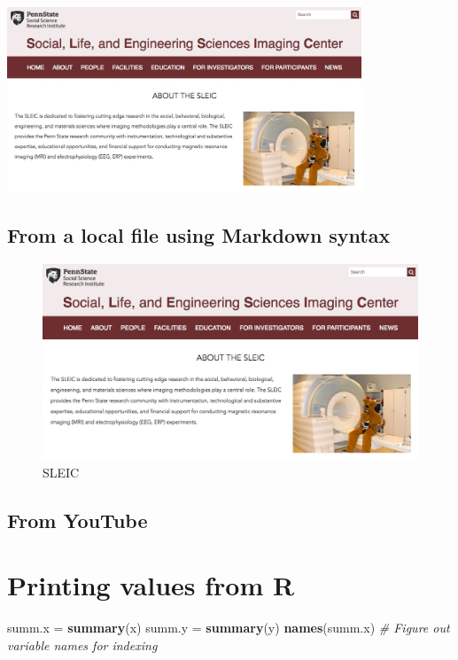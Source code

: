 \documentclass[]{article}
\newenvironment{Shaded}{\begin{snugshade}}{\end{snugshade}}
\newcommand{\CommentTok}[1]{\textcolor[rgb]{0.56,0.35,0.01}{\textit{#1}}}
\newcommand{\KeywordTok}[1]{\textcolor[rgb]{0.13,0.29,0.53}{\textbf{#1}}}
\newcommand{\NormalTok}[1]{#1}
\newcommand{\StringTok}[1]{\textcolor[rgb]{0.31,0.60,0.02}{#1}}
\begin{document}
\begin{center}\includegraphics[width=400px]{img/sleic} \end{center}

\hypertarget{from-a-local-file-using-markdown-syntax}{%
\subsection{From a local file using Markdown
syntax}\label{from-a-local-file-using-markdown-syntax}}

\begin{figure}
\centering
\includegraphics{img/sleic.jpg}
\caption{SLEIC}
\end{figure}

\hypertarget{from-youtube}{%
\subsection{From YouTube}\label{from-youtube}}

\hypertarget{printing-values-from-r}{%
\section{Printing values from R}\label{printing-values-from-r}}

\begin{Shaded}
\begin{Highlighting}[]
\NormalTok{summ.x =}\StringTok{ }\KeywordTok{summary}\NormalTok{(x)}
\NormalTok{summ.y =}\StringTok{ }\KeywordTok{summary}\NormalTok{(y)}
\KeywordTok{names}\NormalTok{(summ.x) }\CommentTok{# Figure out variable names for indexing}
\end{Highlighting}
\end{Shaded}
\end{document}
